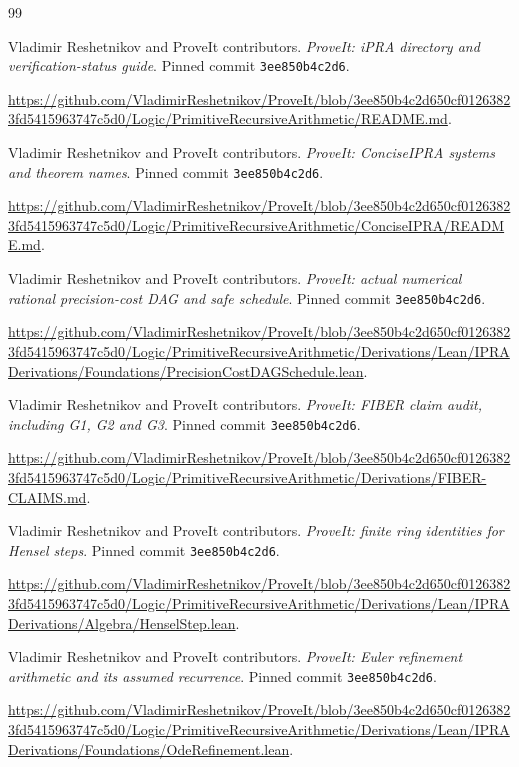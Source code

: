 \begin{thebibliography}{99}

\small

 Vladimir Reshetnikov and ProveIt contributors. \emph{ProveIt: iPRA directory and verification-status guide}. Pinned commit \nolinkurl{3ee850b4c2d6}.

\url{https://github.com/VladimirReshetnikov/ProveIt/blob/3ee850b4c2d650cf01263823fd5415963747c5d0/Logic/PrimitiveRecursiveArithmetic/README.md}.

 Vladimir Reshetnikov and ProveIt contributors. \emph{ProveIt: ConciseIPRA systems and theorem names}. Pinned commit \nolinkurl{3ee850b4c2d6}.

\url{https://github.com/VladimirReshetnikov/ProveIt/blob/3ee850b4c2d650cf01263823fd5415963747c5d0/Logic/PrimitiveRecursiveArithmetic/ConciseIPRA/README.md}.

 Vladimir Reshetnikov and ProveIt contributors. \emph{ProveIt: actual numerical rational precision-cost DAG and safe schedule}. Pinned commit \nolinkurl{3ee850b4c2d6}.

\url{https://github.com/VladimirReshetnikov/ProveIt/blob/3ee850b4c2d650cf01263823fd5415963747c5d0/Logic/PrimitiveRecursiveArithmetic/Derivations/Lean/IPRADerivations/Foundations/PrecisionCostDAGSchedule.lean}.

 Vladimir Reshetnikov and ProveIt contributors. \emph{ProveIt: FIBER claim audit, including G1, G2 and G3}. Pinned commit \nolinkurl{3ee850b4c2d6}.

\url{https://github.com/VladimirReshetnikov/ProveIt/blob/3ee850b4c2d650cf01263823fd5415963747c5d0/Logic/PrimitiveRecursiveArithmetic/Derivations/FIBER-CLAIMS.md}.

 Vladimir Reshetnikov and ProveIt contributors. \emph{ProveIt: finite ring identities for Hensel steps}. Pinned commit \nolinkurl{3ee850b4c2d6}.

\url{https://github.com/VladimirReshetnikov/ProveIt/blob/3ee850b4c2d650cf01263823fd5415963747c5d0/Logic/PrimitiveRecursiveArithmetic/Derivations/Lean/IPRADerivations/Algebra/HenselStep.lean}.

 Vladimir Reshetnikov and ProveIt contributors. \emph{ProveIt: Euler refinement arithmetic and its assumed recurrence}. Pinned commit \nolinkurl{3ee850b4c2d6}.

\url{https://github.com/VladimirReshetnikov/ProveIt/blob/3ee850b4c2d650cf01263823fd5415963747c5d0/Logic/PrimitiveRecursiveArithmetic/Derivations/Lean/IPRADerivations/Foundations/OdeRefinement.lean}.


\end{thebibliography}
